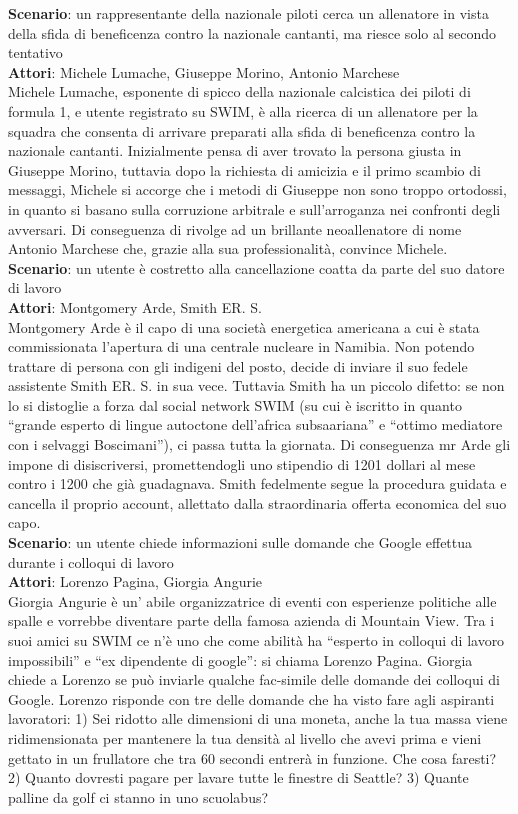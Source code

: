 \documentclass[a4paper,12pt]{article}
\begin{document}
\textbf{Scenario}: un rappresentante della nazionale piloti cerca un allenatore in vista della sfida di beneficenza contro la nazionale cantanti, ma riesce solo al secondo tentativo \\
\textbf{Attori}: Michele Lumache, Giuseppe Morino, Antonio Marchese \\
Michele Lumache, esponente di spicco della nazionale calcistica dei piloti di formula 1, e utente registrato su SWIM, è alla ricerca di un allenatore per la squadra che consenta di arrivare preparati alla sfida di beneficenza contro la nazionale cantanti. Inizialmente pensa di aver trovato la persona giusta in Giuseppe Morino, tuttavia dopo la richiesta di amicizia e il primo scambio di messaggi, Michele si accorge che i metodi di Giuseppe non sono troppo ortodossi, in quanto si basano sulla corruzione arbitrale e sull'arroganza nei confronti degli avversari. Di conseguenza di rivolge ad un brillante neoallenatore di nome Antonio Marchese che, grazie alla sua professionalità, convince Michele. \\[1.5em]
\textbf{Scenario}: un utente è costretto alla cancellazione coatta da parte del suo datore di lavoro \\
\textbf{Attori}: Montgomery Arde, Smith ER. S. \\
Montgomery Arde è il capo di una società energetica americana a cui è stata commissionata l'apertura di una centrale nucleare in Namibia. Non potendo trattare di persona con gli indigeni del posto, decide di inviare il suo fedele assistente Smith ER. S. in sua vece. Tuttavia Smith ha un piccolo difetto: se non lo si distoglie a forza dal social network SWIM (su cui è iscritto in quanto “grande esperto di lingue autoctone dell'africa subsaariana” e “ottimo mediatore con i selvaggi Boscimani”), ci passa tutta la giornata. Di conseguenza mr Arde gli impone di disiscriversi, promettendogli uno stipendio di 1201 dollari al mese contro i 1200 che già guadagnava. Smith fedelmente segue la procedura guidata e cancella il proprio account, allettato dalla straordinaria offerta economica del suo capo. \\[1.5em]
\textbf{Scenario}: un utente chiede informazioni sulle domande che Google effettua durante i colloqui di lavoro \\
\textbf{Attori}: Lorenzo Pagina, Giorgia Angurie \\
Giorgia Angurie è un' abile organizzatrice di eventi con esperienze politiche alle spalle e vorrebbe diventare parte della famosa azienda di Mountain View. Tra i suoi amici su SWIM ce n'è uno che come abilità ha “esperto in colloqui di lavoro impossibili” e “ex dipendente di google”: si chiama Lorenzo Pagina. Giorgia chiede a Lorenzo se può inviarle qualche fac-simile delle domande dei colloqui di Google. Lorenzo risponde con tre delle domande che ha visto fare agli aspiranti lavoratori: 1) Sei ridotto alle dimensioni di una moneta, anche la tua massa viene ridimensionata per mantenere la tua densità al livello che avevi prima e vieni gettato in un frullatore che tra 60 secondi entrerà in funzione. Che cosa faresti?  2) Quanto dovresti pagare per lavare tutte le finestre di Seattle?  3) Quante palline da golf ci stanno in uno scuolabus? \\[1.5em]
\end{document}
